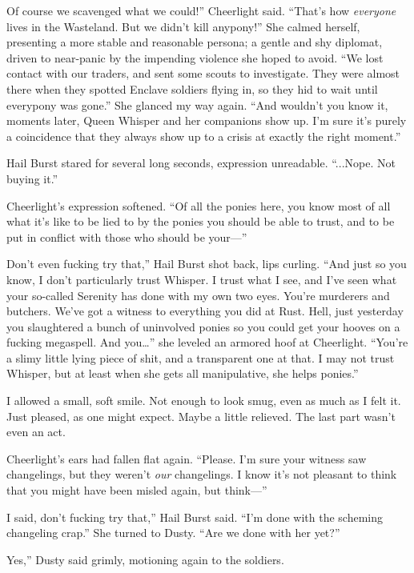 \leavevmode{}Of course we scavenged what we could!” Cheerlight said. “That’s how \textit{everyone} lives in the Wasteland. But we didn’t kill anypony!” She calmed herself, presenting a more stable and reasonable persona; a gentle and shy diplomat, driven to near-panic by the impending violence she hoped to avoid. “We lost contact with our traders, and sent some scouts to investigate. They were almost there when they spotted Enclave soldiers flying in, so they hid to wait until everypony was gone.” She glanced my way again. “And wouldn’t you know it, moments later, Queen Whisper and her companions show up. I’m sure it’s purely a coincidence that they always show up to a crisis at exactly the right moment.”

Hail Burst stared for several long seconds, expression unreadable. “...Nope. Not buying it.”

Cheerlight’s expression softened. “Of all the ponies here, you know most of all what it’s like to be lied to by the ponies you should be able to trust, and to be put in conflict with those who should be your—”

\leavevmode{}Don’t even fucking try that,” Hail Burst shot back, lips curling. “And just so you know, I don’t particularly trust Whisper. I trust what I see, and I’ve seen what your so-called Serenity has done with my own two eyes. You’re murderers and butchers. We’ve got a witness to everything you did at Rust. Hell, just yesterday you slaughtered a bunch of uninvolved ponies so you could get your hooves on a fucking megaspell. And you…” she leveled an armored hoof at Cheerlight. “You’re a slimy little lying piece of shit, and a transparent one at that. I may not trust Whisper, but at least when she gets all manipulative, she helps ponies.”

I allowed a small, soft smile. Not enough to look smug, even as much as I felt it. Just pleased, as one might expect. Maybe a little relieved. The last part wasn’t even an act.

Cheerlight’s ears had fallen flat again. “Please. I’m sure your witness saw changelings, but they weren’t \textit{our} changelings. I know it’s not pleasant to think that you might have been misled again, but think—”

\leavevmode{}I said, don’t fucking try that,” Hail Burst said. “I’m done with the scheming changeling crap.” She turned to Dusty. “Are we done with her yet?”

\leavevmode{}Yes,” Dusty said grimly, motioning again to the soldiers.

